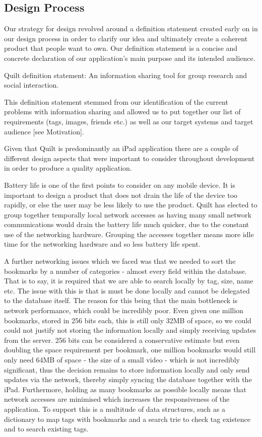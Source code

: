 \documentclass[a4wide, 10pt]{article}
\begin{document}
\subsection{Design Process}

Our strategy for design revolved around a definition statement created early on in our design process in order to clarify our idea and ultimately create a coherent product that people want to own. Our definition statement is a concise and concrete declaration of our application's main purpose and its intended audience.

Quilt definition statement: An information sharing tool for group research and social interaction.

This definition statement stemmed from our identification of the current problems with information sharing and allowed us to put together our list of requirements (tags, images, friends etc.) as well as our target systems and target audience [see Motivation].

Given that Quilt is predominantly an iPad application there are a couple of different design aspects that were important to consider throughout development in order to produce a quality application.

Battery life is one of the first points to consider on any mobile device. It is important to design a product that does not drain the life of the device too rapidly, or else the user may be less likely to use the product. Quilt has elected to group together temporally local network accesses as having many small network communications would drain the battery life much quicker, due to the constant use of the networking hardware. Grouping the accesses together means more idle time for the networking hardware and so less battery life spent.

A further networking issues which we faced was that we needed to sort the bookmarks by a number of categories - almost every field within the database. That is to say, it is required that we are able to search locally by tag, size, name etc. The issue with this is that is must be done locally and cannot be delegated to the database itself. The reason for this being that the main bottleneck is network performance, which could be incredibly poor. Even given one million bookmarks, stored in 256 bits each, this is still only 32MB of space, so we could could not justify not storing the information locally and simply receiving updates from the server. 256 bits can be considered a conservative estimate but even doubling the space requirement per bookmark, one million bookmarks would still only need 64MB of space - the size of a small video - which is not incredibly significant, thus the decision remains to store information locally and only send updates via the network, thereby simply syncing the database together with the iPad. Furthermore, holding as many bookmarks as possible locally means that network accesses are minimised which increases the responsiveness of the application. To support this is a multitude of data structures, such as a dictionary to map tags with bookmarks and a search trie to check tag existence and to search existing tags.
\end{document}
